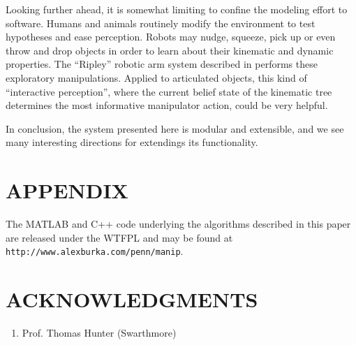 \documentclass[letterpaper, 10 pt, conference]{ieeeconf}  %
\begin{document}
Looking further ahead, it is somewhat limiting to confine the modeling effort to software. Humans and animals routinely modify the environment to test hypotheses and ease perception. Robots may nudge, squeeze, pick up or even throw and drop objects in order to learn about their kinematic and dynamic properties. The ``Ripley'' robotic arm system described in \cite{Hsiao2005} performs these exploratory manipulations. Applied to articulated objects, this kind of ``interactive perception'', where the current belief state of the kinematic tree determines the most informative manipulator action, could be very helpful.

In conclusion, the system presented here is modular and extensible, and we see many interesting directions for extendings its functionality.


\section*{APPENDIX}

The MATLAB and C++ code underlying the algorithms described in this paper are released under the WTFPL and may be found at \texttt{http://www.alexburka.com/penn/manip}.

\section*{ACKNOWLEDGMENTS}

\begin{enumerate}
  \item Prof. Thomas Hunter (Swarthmore)
\end{enumerate}




\end{document}
